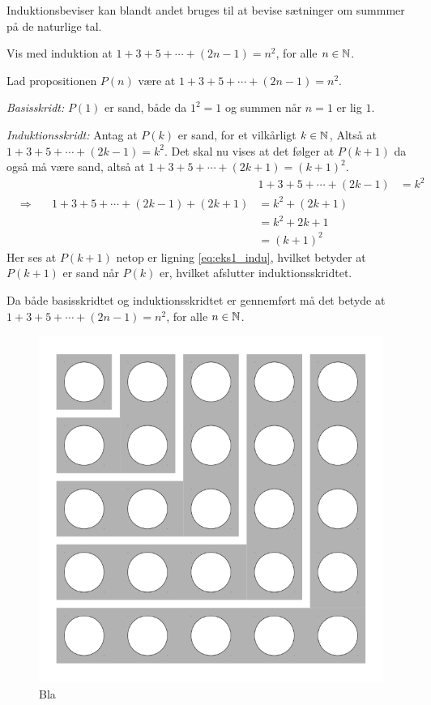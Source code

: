Induktionsbeviser kan blandt andet bruges til at bevise sætninger om summmer på de naturlige tal.
\begin{exmp}
	Vis med induktion at $1 + 3 + 5 + \dotsb + (2n-1) = n^2$, for alle $n \in \mathbb{N}$.

	Lad propositionen $P(n)$ være at $1 + 3 + 5 + \dotsb + (2n-1) = n^2$.
	
	\textit{Basisskridt:} $P(1)$ er sand, både da $1^2 = 1$ og summen når $n = 1$ er lig $1$.

	\textit{Induktionsskridt:} Antag at $P(k)$ er sand, for et vilkårligt $k \in \mathbb{N}$, Altså at $1 + 3 + 5 + \dotsb + (2k-1) = k^2$.
	Det skal nu vises at det følger at $P(k + 1)$ da også må være sand, altså at $1 + 3 + 5 + \dotsb + (2k+1) = \left( k + 1 \right) ^2$.
	\begin{align}
		&&&1 + 3 + 5 + \dotsb + (2k-1) 
		&= k^2 \nonumber \\
		&\Rightarrow \quad
		&1 + 3 + 5 + \dotsb + (2k-1) + (2k+1) 
		&= k^2 + (2k + 1) \nonumber \\
		&&&= k^2 + 2k + 1 \nonumber \\
		&&&= \left( k + 1 \right) ^2 \label{eq:eks1_indu}
	\end{align}
	Her ses at $P(k + 1)$ netop er ligning \eqref{eq:eks1_indu}, hvilket betyder at $P(k + 1)$ er sand når $P(k)$ er, hvilket afslutter induktionsskridtet.

	Da både basisskridtet og induktionsskridtet er gennemført må det betyde at $1 + 3 + 5 + \dotsb + (2n-1) = n^2$, for alle $n \in \mathbb{N}$.
\end{exmp}

\begin{figure}
	\begin{center}
		\includegraphics[scale=0.2]{fig/img/sum_of_n_first_odd_integers.png}
	\end{center}
	\caption{Bla} \label{fig1_indu}
\end{figure}

